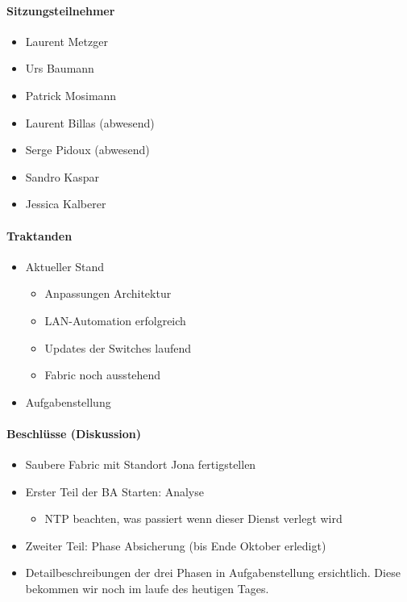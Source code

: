 \paragraph{Sitzungsteilnehmer}
\begin{itemize}	
	\item Laurent Metzger 
	\item Urs Baumann 
	\item Patrick Mosimann
	\item Laurent Billas (abwesend)
	\item Serge Pidoux (abwesend)
	\item Sandro Kaspar
	\item Jessica Kalberer
\end{itemize}

\paragraph{Traktanden}
\begin{itemize}	
	\item Aktueller Stand 
	\begin{itemize}
		\item Anpassungen Architektur
		\item LAN-Automation erfolgreich
		\item Updates der Switches laufend
		\item Fabric noch ausstehend
	\end{itemize}
	\item Aufgabenstellung	
\end{itemize}

\paragraph{Beschlüsse (Diskussion)}
\begin{itemize}	
	\item Saubere Fabric mit Standort Jona fertigstellen
	\item Erster Teil der BA Starten: Analyse
	\begin{itemize}
		\item NTP beachten, was passiert wenn dieser Dienst verlegt wird
	\end{itemize}
	\item Zweiter Teil: Phase Absicherung (bis Ende Oktober erledigt)
	\item Detailbeschreibungen der drei Phasen in Aufgabenstellung ersichtlich. Diese bekommen wir noch im laufe des heutigen Tages.
\end{itemize}

